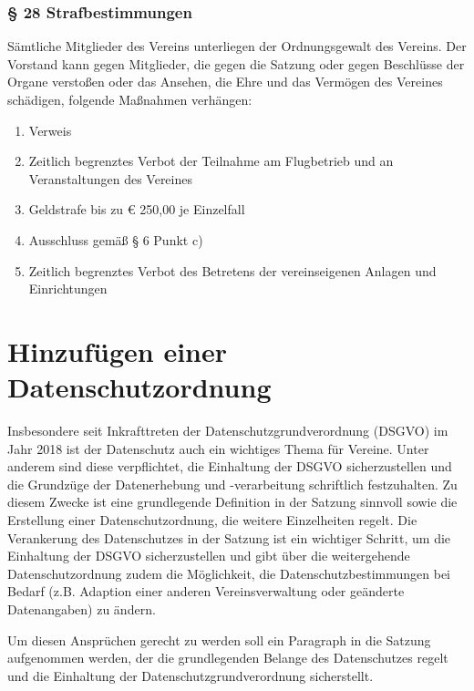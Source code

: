 \documentclass[10pt,a4paper,parskip=half]{scrartcl}
\newcommand{\change}[1]{
  \begin{adjustwidth}{20pt}{20pt}
    #1
  \end{adjustwidth}
}
\begin{document}
  \change{
    \subsubsection*{§ 28 Strafbestimmungen}
    Sämtliche Mitglieder des Vereins unterliegen der Ordnungsgewalt des Vereins.
    Der Vorstand kann gegen Mitglieder,
    die gegen die Satzung oder gegen Beschlüsse der Organe verstoßen oder das Ansehen,
    die Ehre und das Vermögen des Vereines schädigen,
    folgende Maßnahmen verhängen:
    \begin{enumerate}[label=\alph*),noitemsep]
      \item Verweis
      \item Zeitlich begrenztes Verbot der Teilnahme am Flugbetrieb und an Veranstaltungen des Vereines
      \item Geldstrafe bis zu € 250,00 je Einzelfall
      \item Ausschluss gemäß § 6 Punkt c)
      \item Zeitlich begrenztes Verbot des Betretens der vereinseigenen Anlagen und Einrichtungen
    \end{enumerate}
  }

  \clearpage
  \section{Hinzufügen einer Datenschutzordnung}
  Insbesondere seit Inkrafttreten der Datenschutzgrundverordnung (DSGVO) im Jahr 2018 ist der Datenschutz auch ein wichtiges Thema für Vereine. Unter anderem sind diese verpflichtet, die Einhaltung der DSGVO sicherzustellen und die Grundzüge der Datenerhebung und -verarbeitung schriftlich festzuhalten. Zu diesem Zwecke ist eine grundlegende Definition in der Satzung sinnvoll sowie die Erstellung einer Datenschutzordnung, die weitere Einzelheiten regelt. Die Verankerung des Datenschutzes in der Satzung ist ein wichtiger Schritt,  um die Einhaltung der DSGVO sicherzustellen und gibt über die weitergehende Datenschutzordnung zudem die Möglichkeit, die Datenschutzbestimmungen bei Bedarf (z.B. Adaption einer anderen Vereinsverwaltung oder geänderte Datenangaben) zu ändern.

  Um diesen Ansprüchen gerecht zu werden soll ein Paragraph in die Satzung aufgenommen werden, der die grundlegenden Belange des Datenschutzes regelt und die Einhaltung der Datenschutzgrundverordnung sicherstellt.
\end{document}
